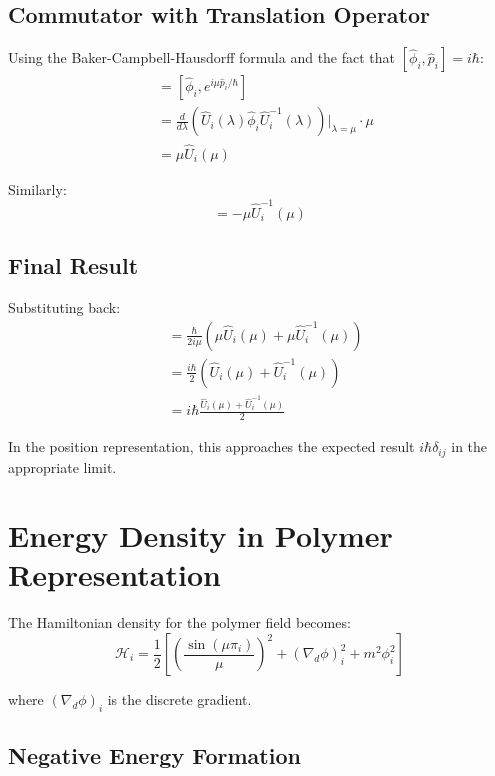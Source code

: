 \documentclass[12pt]{article}
\begin{document}
\subsection{Commutator with Translation Operator}

Using the Baker-Campbell-Hausdorff formula and the fact that $[\hat{\phi}_i, \hat{p}_i] = i\hbar$:
\begin{align}
[\hat{\phi}_i, \hat{U}_i(\mu)] &= [\hat{\phi}_i, e^{i\mu \hat{p}_i/\hbar}] \\
&= \frac{d}{d\lambda}\left(\hat{U}_i(\lambda)\hat{\phi}_i\hat{U}_i^{-1}(\lambda)\right)\bigg|_{\lambda=\mu} \cdot \mu \\
&= \mu \hat{U}_i(\mu)
\end{align}

Similarly:
\begin{equation}
[\hat{\phi}_i, \hat{U}_i^{-1}(\mu)] = -\mu \hat{U}_i^{-1}(\mu)
\end{equation}

\subsection{Final Result}

Substituting back:
\begin{align}
[\hat{\phi}_i, \hat{\pi}_i^{\text{poly}}] &= \frac{\hbar}{2i\mu} \left(\mu \hat{U}_i(\mu) + \mu \hat{U}_i^{-1}(\mu)\right) \\
&= \frac{i\hbar}{2} \left(\hat{U}_i(\mu) + \hat{U}_i^{-1}(\mu)\right) \\
&= i\hbar \frac{\hat{U}_i(\mu) + \hat{U}_i^{-1}(\mu)}{2}
\end{align}

In the position representation, this approaches the expected result $i\hbar\delta_{ij}$ in the appropriate limit.

\section{Energy Density in Polymer Representation}

The Hamiltonian density for the polymer field becomes:
\begin{equation}
\mathcal{H}_i = \frac{1}{2}\left[ \left(\frac{\sin(\mu \pi_i)}{\mu}\right)^2 + (\nabla_d \phi)_i^2 + m^2 \phi_i^2 \right]
\end{equation}

where $(\nabla_d \phi)_i$ is the discrete gradient.

\subsection{Negative Energy Formation}
\end{document}
